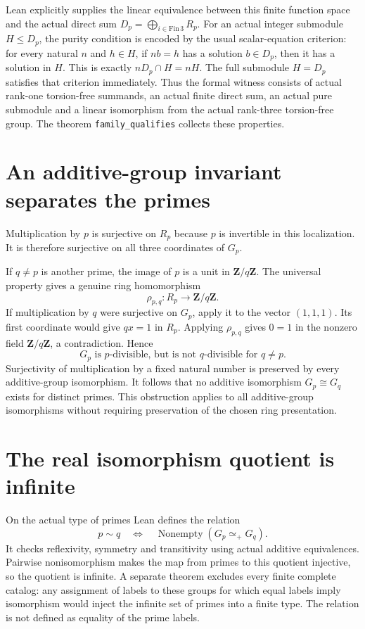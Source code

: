 \documentclass[11pt]{article}
\begin{document}
\newpage
Lean explicitly supplies the linear equivalence between this finite
function space and the actual direct sum
$D_p=\bigoplus_{i\in\mathrm{Fin}\,3}R_p$.
For an actual integer submodule $H\le D_p$, the purity condition is
encoded by the usual scalar-equation criterion: for every natural
$n$ and $h\in H$, if $nb=h$ has a solution $b\in D_p$, then it has
a solution in $H$. This is exactly $nD_p\cap H=nH$.
The full submodule $H=D_p$ satisfies that criterion immediately.
Thus the formal witness consists of actual rank-one torsion-free
summands, an actual finite direct sum, an actual pure submodule and
a linear isomorphism from the actual rank-three torsion-free group.
The theorem \texttt{family\_qualifies} collects these properties.

\section{An additive-group invariant separates the primes}
Multiplication by $p$ is surjective on $R_p$ because $p$ is invertible
in this localization. It is therefore surjective on all three
coordinates of $G_p$.

If $q\ne p$ is another prime, the image of $p$ is a unit in
$\mathbf Z/q\mathbf Z$. The universal property gives a genuine ring
homomorphism
\[
 \rho_{p,q}:R_p\longrightarrow\mathbf Z/q\mathbf Z.
\]
If multiplication by $q$ were surjective on $G_p$, apply it to the
vector $(1,1,1)$. Its first coordinate would give $qx=1$ in $R_p$.
Applying $\rho_{p,q}$ gives $0=1$ in the nonzero field
$\mathbf Z/q\mathbf Z$, a contradiction. Hence
\[
 G_p\text{ is $p$-divisible, but is not $q$-divisible for }q\ne p.
\]
Surjectivity of multiplication by a fixed natural number is preserved
by every additive-group isomorphism. It follows that no additive
isomorphism $G_p\cong G_q$ exists for distinct primes. This obstruction applies to all additive-group isomorphisms without
requiring preservation of the chosen ring presentation.

\section{The real isomorphism quotient is infinite}
On the actual type of primes Lean defines the relation
\[
 p\sim q\quad\Longleftrightarrow\quad
       \operatorname{Nonempty}(G_p\simeq_+G_q).
\]
It checks reflexivity, symmetry and transitivity using actual additive
equivalences. Pairwise nonisomorphism makes the map from primes to
this quotient injective, so the quotient is infinite. A separate
theorem excludes every finite complete catalog: any assignment of
labels to these groups for which equal labels imply isomorphism
would inject the infinite set of primes into a finite type.
The relation is not defined as equality of the prime labels.
\end{document}
